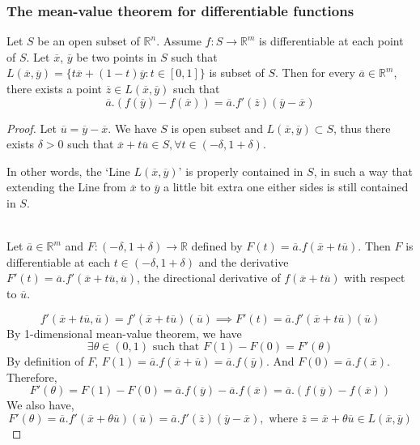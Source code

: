 \subsubsection{The mean-value theorem for differentiable functions}
\begin{theorem}
	Let $S$ be an open subset of $\mathbb{R}^n$.
	Assume $f : S \to \mathbb{R}^m$ is differentiable at each point of $S$.
	Let $\overline{x}$, $\overline{y}$ be two points in $S$ such that $L(\overline{x},\overline{y}) = \{ t\overline{x}+(1-t)\overline{y} : t \in [0,1] \}$ is subset of $S$.
	Then for every $\overline{a} \in \mathbb{R}^m$, there exists a point $\overline{z} \in L(\overline{x},\overline{y})$ such that
	\[ \overline{a}.\left( f(\overline{y})-f(\overline{x}) \right) = \overline{a}.f'(\overline{z})(\overline{y}-\overline{x}) \]
\end{theorem}
\begin{proof}
	Let $\overline{u} = \overline{y}-\overline{x}$.
	We have $S$ is open subset and $L(\overline{x},\overline{y}) \subset S$, thus there exists $\delta > 0$ such that $\overline{x}+t\overline{u} \in S, \forall t \in (-\delta,1+\delta)$.
	\begin{commentary} In other words, the `Line $L(\overline{x},\overline{y})$' is properly contained in $S$, in such a way that extending the Line from $\overline{x}$ to $\overline{y}$ a little bit extra one either sides is still contained in $S$.\end{commentary}\\

	Let $\overline{a} \in \mathbb{R}^m$ and $F : (-\delta,1+\delta) \to \mathbb{R}$ defined by $F(t) = \overline{a}.f(\overline{x}+t\overline{u})$.
	Then $F$ is differentiable at each $t \in (-\delta,1+\delta)$ and the derivative $F'(t) = \overline{a}.f'(\overline{x}+t\overline{u},\overline{u})$, the directional derivative of $f(\overline{x}+t\overline{u})$ with respect to $\overline{u}$.

	\[ f'(\overline{x}+t\overline{u},\overline{u}) = f'(\overline{x}+t\overline{u})(\overline{u}) \implies F'(t) = \overline{a}.f'(\overline{x}+t\overline{u})(\overline{u}) \]
	By 1-dimensional mean-value theorem, we have
	\[ \exists \theta \in (0,1) \text{ such that } F(1) - F(0) = F'(\theta) \]
	By definition of $F$, $F(1) = \overline{a}.f(\overline{x}+\overline{u}) = \overline{a}.f(\overline{y})$.
	And $F(0) =\overline{a}.f(\overline{x})$.
	Therefore,
	\[ F'(\theta) = F(1) - F(0) = \overline{a}.f(\overline{y}) - \overline{a}.f(\overline{x}) = \overline{a}.(f(\overline{y})-f(\overline{x})) \]
	We also have,
	\[ F'(\theta) = \overline{a}.f'(\overline{x}+\theta \overline{u})(\overline{u}) = \overline{a}.f'(\overline{z})(\overline{y}-\overline{x}), \text{ where } \overline{z} = \overline{x}+\theta \overline{u} \in L(\overline{x},\overline{y}) \]
\end{proof}


